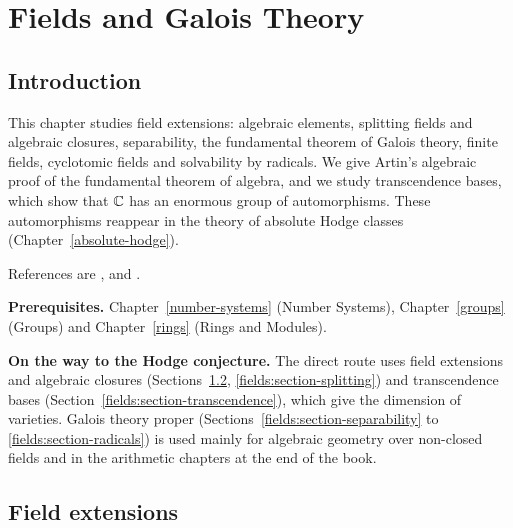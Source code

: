 \chapter{Fields and Galois Theory}\label{fields}

\section{Introduction}\label{fields:section-introduction}

This chapter studies field extensions: algebraic elements, splitting fields and
algebraic closures, separability, the fundamental theorem of Galois theory, finite
fields, cyclotomic fields and solvability by radicals. We give Artin's algebraic proof
of the fundamental theorem of algebra, and we study transcendence bases, which show
that $\mathbb{C}$ has an enormous group of automorphisms. These automorphisms reappear in the
theory of absolute Hodge classes (Chapter~\ref{absolute-hodge}).

References are \cite{lang-algebra}, \cite{artin-galois} and \cite{stewart-galois}.

\noindent\textbf{Prerequisites.} Chapter~\ref{number-systems} (Number Systems),
Chapter~\ref{groups} (Groups) and Chapter~\ref{rings} (Rings and Modules).

\noindent\textbf{On the way to the Hodge conjecture.} The direct route uses field extensions and algebraic closures (Sections~\ref{fields:section-extensions}, \ref{fields:section-splitting}) and transcendence bases (Section~\ref{fields:section-transcendence}),
which give the dimension of varieties. Galois theory proper (Sections~\ref{fields:section-separability} to \ref{fields:section-radicals}) is used mainly for algebraic geometry over non-closed fields and in the
arithmetic chapters at the end of the book.

\section{Field extensions}\label{fields:section-extensions}

